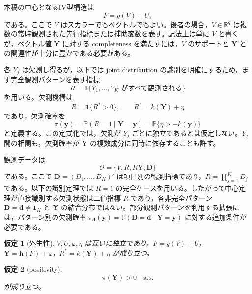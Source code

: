 \documentclass[10pt,a4paper]{article}
\newtheorem{assumption}{仮定}
\newcommand{\Prb}{\mathbb{P}}
\newcommand{\R}{\mathbb{R}}
\newcommand{\1}{\mathbf{1}}
\newcommand{\calO}{\mathcal{O}}
\newcommand{\Y}{\bm{Y}}
\newcommand{\D}{\bm{D}}
\newcommand{\eps}{\bm{\varepsilon}}
\begin{document}
本稿の中心となるIV型構造は
\begin{equation}
  F=g(V)+U,
  \label{eq:main-iv-structure}
\end{equation}
である。ここで $V$ はスカラーでもベクトルでもよい。後者の場合，$V\in\R^q$ は複数の常時観測された先行指標または補助変数を表す。記法上は単に $V$ と書くが，ベクトル値 $\Y$ に対する completeness を満たすには，$V$ のサポートと $\Y$ との関連性が十分に豊かである必要がある。

各 $Y_j$ は欠測し得るが，以下では joint distribution の識別を明確にするため，まず完全観測パターンを表す指標
\begin{equation}
  R=\1\{Y_1,\ldots,Y_K\text{ がすべて観測される}\}
\end{equation}
を用いる。欠測機構は
\begin{equation}
  R=\1\{R^*>0\},
  \qquad
  R^*=k(\Y)+\eta
  \label{eq:vector-y-missing}
\end{equation}
であり，欠測確率を
\begin{equation}
  \pi(\bm y)=\Prb(R=1\mid \Y=\bm y)
  =\Prb\{\eta>-k(\bm y)\}
  \label{eq:vector-pi}
\end{equation}
と定義する。この定式化では，欠測が $Y_j$ ごとに独立であるとは仮定しない。$Y_j$ 間の相関も，欠測確率が $\Y$ の複数成分に同時に依存することも許す。

観測データは
\begin{equation}
  \calO=\{V,R,R\Y,\D\}
  \label{eq:vector-observed-data}
\end{equation}
である。ここで $\D=(D_1,\ldots,D_K)'$ は項目別の観測指標であり，$R=\prod_{j=1}^K D_j$ である。以下の識別定理では $R=1$ の完全ケースを用いる。したがって中心定理が直接識別する欠測状態は二値指標 $R$ であり，各非完全パターン $\D=\bm d\ne\bm 1_K$ と $\Y$ の結合分布ではない。部分観測パターンを利用する拡張には，パターン別の欠測確率 $\pi_{\bm d}(\bm y)=\Prb(\D=\bm d\mid \Y=\bm y)$ に対する追加条件が必要である。

\begin{assumption}[外生性]
\label{ass:vector-exogeneity}
$V,U,\eps,\eta$ は互いに独立であり，$F=g(V)+U$，$\Y=\bm h(F)+\eps$，$R^*=k(\Y)+\eta$ が成り立つ。
\end{assumption}

\begin{assumption}[positivity]
\label{ass:vector-positivity}
\begin{equation}
  \pi(\Y)>0\quad \mathrm{a.s.}
  \label{eq:vector-positivity}
\end{equation}
が成り立つ。
\end{assumption}
\end{document}
